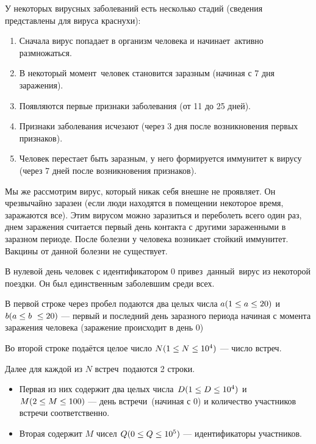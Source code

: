 
У некоторых вирусных заболеваний есть несколько стадий (сведения представлены для вируса краснухи):

\begin{enumerate}
\item Сначала вирус попадает в организм человека и начинает активно размножаться.
\item В некоторый момент человек становится заразным (начиная с 7 дня заражения).
\item Появляются первые признаки заболевания (от 11 до 25 дней).
\item Признаки заболевания исчезают (через 3 дня после возникновения первых признаков).
\item Человек перестает быть заразным, у него формируется иммунитет к вирусу (через 7 дней после возникновения признаков).
\end{enumerate}
Мы же рассмотрим вирус, который никак себя внешне не проявляет. Он чрезвычайно заразен (если люди находятся в помещении некоторое время, заражаются все). Этим вирусом можно заразиться и переболеть всего один раз, днем заражения считается первый день контакта с другими зараженными в заразном периоде. После болезни у человека возникает стойкий иммунитет. Вакцины от данной болезни не существует.

В нулевой день человек с идентификатором 0 привез данный вирус из некоторой поездки. Он был единственным заболевшим среди всех.

В первой строке через пробел подаются два целых числа $a\space (1\leq a \leq 20)$ и $b\space(a \leq b \leq 20)$ — первый и последний день заразного периода начиная с момента заражения человека (заражение происходит в день 0)

Во второй строке подаётся целое число $N\space(1\leq N\leq 10^4)$ — число встреч.

Далее для каждой из $N$ встреч подаются 2 строки.

\begin{itemize}
\item Первая из них содержит два целых числа $D\space(1\leq D\leq 10^4)$ и $M\space(2\leq M\leq 100)$ — день встречи (начиная с 0) и количество участников встречи соответственно.
\item Вторая содержит $M$ чисел $Q\space(0\leq Q\leq 10^5)$ — идентификаторы участников.
\end{itemize}

\outputfmtSection

